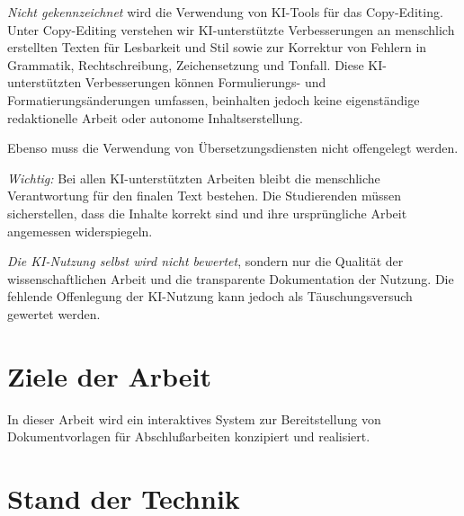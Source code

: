 \documentclass[12pt,        %
  english,ngerman,          %
  paper=a4,                 %
  captions=tablesignature,  %
  listof=numbered,          %
  bibliography=totoc,       %
  headings=small,           %
  headinclude=false,        %
  footinclude=false,        %
  parskip=half-,            %
  oneside,                  %
  BCOR=5mm,                 %
  DIV=12                    %
  ]{scrbook}                %
\begin{document}
\textit{Nicht gekennzeichnet} wird die Verwendung von KI-Tools für das Copy-Editing. Unter Copy-Editing verstehen wir KI-unterstützte Verbesserungen an menschlich erstellten Texten für Lesbarkeit und Stil sowie zur Korrektur von Fehlern in Grammatik, Rechtschreibung, Zeichensetzung und Tonfall. Diese KI-unterstützten Verbesserungen können Formulierungs- und Formatierungsänderungen umfassen, beinhalten jedoch keine eigenständige redaktionelle Arbeit oder autonome Inhaltserstellung.

Ebenso muss die Verwendung von Übersetzungsdiensten nicht offengelegt werden.
  
\textit{Wichtig:} Bei allen KI-unterstützten Arbeiten bleibt die menschliche Verantwortung für den finalen Text bestehen. Die Studierenden müssen sicherstellen, dass die Inhalte korrekt sind und ihre ursprüngliche Arbeit angemessen widerspiegeln.
    
\textit{Die KI-Nutzung selbst wird nicht bewertet}, sondern nur die Qualität der wissenschaftlichen Arbeit und die transparente Dokumentation der Nutzung. Die fehlende Offenlegung der KI-Nutzung kann jedoch als Täuschungsversuch gewertet werden.

\section{Ziele der Arbeit}\label{sec:goals}


In dieser Arbeit wird ein interaktives System zur Bereitstellung von Dokumentvorlagen für Abschlußarbeiten konzipiert und realisiert.

\section{Stand der Technik}\label{sec:state_of_art}

\end{document}

